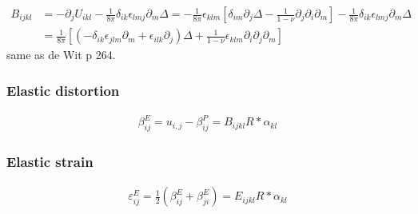 \documentclass[10pt]{report}
\begin{document}
{\begin{align}
B_{ijkl}&=-\partial_{j}U_{ikl}-\frac{1}{8\pi}\delta_{ik}\epsilon_{lmj}\partial_m\Delta
=-\frac{1}{8\pi}\epsilon_{klm}\left[ \delta_{im}\partial_j\Delta  -\frac{1}{1-\nu} \partial_j\partial_i\partial_m  \right]-\frac{1}{8\pi}\delta_{ik}\epsilon_{lmj}\partial_m\Delta\nonumber\\
&=\frac{1}{8\pi}\left[\left(-\delta_{ik}\epsilon_{jlm}\partial_m+\epsilon_{ilk}\partial_j\right)\Delta+\frac{1}{1-\nu}\epsilon_{klm}\partial_i\partial_j\partial_m\right]
\end{align}
same as de Wit p 264.
\subsubsection{Elastic distortion}
\begin{align}
\beta^E_{ij}=u_{i,j}-\beta^P_{ij}=B_{ijkl}R*\alpha_{kl}
\end{align}

\subsubsection{Elastic strain}
\begin{align}
\varepsilon^E_{ij}=\frac{1}{2}\left(\beta^E_{ij}+\beta^E_{ji}\right)=E_{ijkl}R*\alpha_{kl}
\end{align}

}
\end{document}
